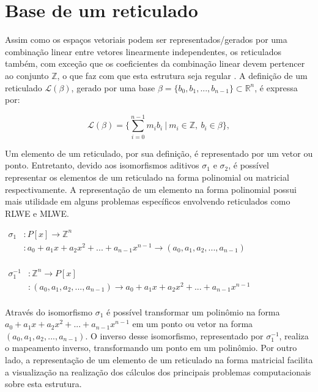 \section{Base de um reticulado}
    Assim como os espaços vetoriais podem ser representados/gerados por uma combinação linear entre vetores linearmente independentes, os reticulados também, com exceção que os coeficientes da combinação linear devem pertencer ao conjunto $\mathbb{Z}$, o que faz com que esta estrutura seja regular \cite{daniele-lattices}. A definição de um reticulado $\mathcal{L(\beta)}$, gerado por uma base $\beta = \{b_0, b_1, ... , b_{n-1}\} \subset \mathbb{R}^{n}$, é expressa por: 
    
    $$\mathcal{L(\beta)} = \Biggl\{\sum_{i=0}^{n-1} m_i b_i\ |\ m_i\in\mathbb{Z},\ b_i \in \beta \Biggl\},$$

    Um elemento de um reticulado, por sua definição, é representado por um vetor ou ponto. Entretanto, devido aos isomorfismos aditivos $\sigma_1$ e $\sigma_2$, é possível representar os elementos de um reticulado na forma polinomial ou matricial respectivamente. A representação de um elemento na forma polinomial possui mais utilidade em alguns problemas específicos envolvendo reticulados como \ac{RLWE} e \ac{MLWE}.
    
    $\begin{array}{rl}
        \sigma_1 &:P[x] \to \mathbb{Z}^n\\
               &:a_0 + a_1 x + a_2 x^2 + ... + a_{n-1} x^{n-1} \to (a_0, a_1, a_2, ... , a_{n-1})
    \end{array}$\\\\

    $\begin{array}{rl}
        \sigma_1^{-1} &:\mathbb{Z}^n \to P[x]\\
               &:(a_0, a_1, a_2, ... , a_{n-1}) \to a_0 + a_1 x + a_2 x^2 + ... + a_{n-1} x^{n-1}
    \end{array}$\\\\

    Através do isomorfismo $\sigma_1$ é possível transformar um polinômio na forma $a_0 + a_1 x + a_2 x^2 + ... + a_{n-1} x^{n-1}$ em um ponto ou vetor na forma $(a_0, a_1, a_2, ... , a_{n-1})$. O inverso desse isomorfismo, representado por $\sigma_1^{-1}$, realiza o mapeamento inverso, transformando um ponto em um polinômio. Por outro lado, a representação de um elemento de um reticulado na forma matricial facilita a visualização na realização dos cálculos dos principais problemas computacionais sobre esta estrutura.
    
